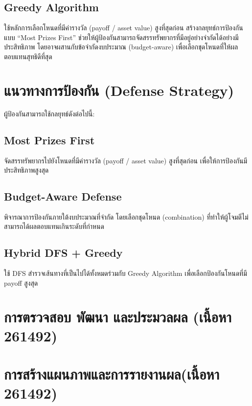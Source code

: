 \subsection{Greedy Algorithm}
ใช้หลักการเลือกโหนดที่มีค่ารางวัล (payoff / asset value) สูงที่สุดก่อน สร้างกลยุทธ์การป้องกันแบบ ``Most Prizes First'' ช่วยให้ผู้ป้องกันสามารถจัดสรรทรัพยากรที่มีอยู่อย่างจำกัดได้อย่างมีประสิทธิภาพ โดยอาจผสานกับข้อจำกัดงบประมาณ (budget-aware) เพื่อเลือกชุดโหนดที่ให้ผลตอบแทนสุทธิดีที่สุด

\section{แนวทางการป้องกัน (Defense Strategy)}

ผู้ป้องกันสามารถใช้กลยุทธ์ดังต่อไปนี้:

\subsection{Most Prizes First}
จัดสรรทรัพยากรไปยังโหนดที่มีค่ารางวัล (payoff / asset value) สูงที่สุดก่อน เพื่อให้การป้องกันมีประสิทธิภาพสูงสุด

\subsection{Budget-Aware Defense}
พิจารณาการป้องกันภายใต้งบประมาณที่จำกัด โดยเลือกชุดโหนด (combination) ที่ทำให้ผู้โจมตีไม่สามารถได้ผลตอบแทนเกินระดับที่กำหนด

\subsection{Hybrid DFS + Greedy}
ใช้ DFS สำรวจเส้นทางที่เป็นไปได้ทั้งหมดร่วมกับ Greedy Algorithm เพื่อเลือกป้องกันโหนดที่มี payoff สูงสุด

\section{การตรวจสอบ พัฒนา และประมวลผล (เนื้อหา 261492)}


\section{การสร้างแผนภาพและการรายงานผล(เนื้อหา 261492)}

